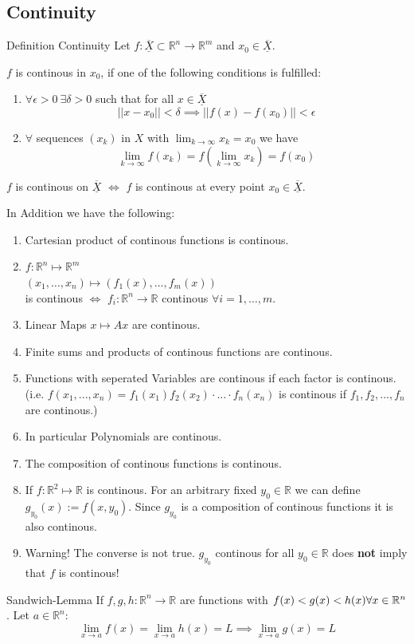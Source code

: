 \documentclass[a4paper,fontsize = 10pt]{article}
\def\R{\mathbb{R}}
\def\X{\underline{\overline{X}}}
\begin{document}
\subsection{Continuity}
\begin{mainbox}{Definition Continuity}
    Let \(f: \X \subset \R^n \to \R^m\)  and \(x_0 \in \X\). 
    
    \(f\) is continous in \(x_0\), if one of the following conditions is fulfilled:
    \begin{enumerate}
        \item \(\forall \epsilon > 0 \ \exists \delta > 0\) such that for all \(x \in \X\) \[||x - x_0|| < \delta \implies ||f(x) - f(x_0)|| < \epsilon\]
        \item \(\forall\) sequences \((x_k)\) in \(X\) with \(\lim_{k \to \infty} x_k = x_0\) we have \[\lim_{k \to \infty} f(x_k) = f\left(\lim_{k \to \infty} x_k\right) = f(x_0)\]
    \end{enumerate}
\end{mainbox}
\(f\) is continous on \(\X\) $\iff$ \(f\) is continous at every point \(x_0 \in \X\). 

In Addition we have the following:
\begin{enumerate}
  \item Cartesian product of continous functions is continous.
  \item \(f: \R^n \mapsto \R^m\)\\
  \((x_1, \ldots, x_n) \mapsto (f_1(x),\ldots,f_m(x))\) \\is continous $\iff$ \(f_i: \R^n \to \R\) continous \(\forall i = 1, \ldots, m\).
  \item Linear Maps \(x \mapsto Ax\) are continous.
  \item Finite sums and products of continous functions are continous.
  \item Functions with seperated Variables are continous if each factor is continous. (i.e. $f(x_1,...,x_n) = f_1(x_1)f_2(x_2)\cdot...\cdot f_n(x_n)$ is continous if $f_1, f_2, ..., f_n$ are continous.)
  \item In particular Polynomials are continous.
  \item The composition of continous functions is continous.
  \item If $f: \R^2 \mapsto \R$ is continous. For an arbitrary fixed $y_0 \in \R$ we can define $g_{y_0}(x) := f(x, y_0)$. Since $g_{y_0}$ is a composition of continous functions it is also continous. 
  \item Warning! The converse is not true. $g_{y_0}$ continous for all $y_0 \in \R$ does \textbf{not} imply that  $f$ is continous!
\end{enumerate}
\begin{mainbox}{Sandwich-Lemma}
  If \(f, g, h: \R^n \to \R\) are functions with \(f(x) < g(x) < h(x) \\ \forall x \in \R^n\). Let $a \in \R^n$:
  \[\lim_{x\to a} f(x) = \lim_{x \to a} h(x) = L \implies \lim_{x\to a} g(x) = L\]
\end{mainbox}
\end{document}
